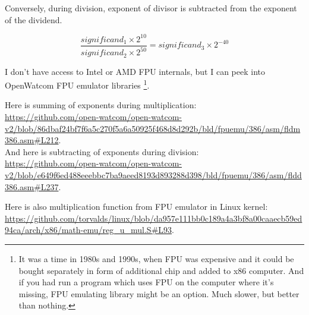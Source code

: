 Conversely, during division, exponent of divisor is subtracted from the exponent of the dividend.

\begin{equation}
\frac{significand_{1} \times 2^{10}}{significand_{2} \times 2^{50}} = significand_{3} \times 2^{-40}
\end{equation}

I don't have access to Intel or AMD FPU internals, but I can peek into OpenWatcom FPU emulator libraries
\footnote{It was a time in 1980s and 1990s, when FPU was expensive and it could be bought separately 
in form of additional chip and added to x86 computer.
And if you had run a program which uses FPU on the computer where it's missing, FPU emulating library might be an option.
Much slower, but better than nothing.}.

Here is summing of exponents during multiplication:\\
\url{https://github.com/open-watcom/open-watcom-v2/blob/86dbaf24bf7f6a5c270f5a6a50925f468d8d292b/bld/fpuemu/386/asm/fldm386.asm\#L212}.\\
And here is subtracting of exponents during division:\\
\url{https://github.com/open-watcom/open-watcom-v2/blob/e649f6ed488eeebbc7ba9aeed8193d893288d398/bld/fpuemu/386/asm/fldd386.asm\#L237}.

Here is also multiplication function from FPU emulator in Linux kernel:
\url{https://github.com/torvalds/linux/blob/da957e111bb0c189a4a3bf8a00caaecb59ed94ca/arch/x86/math-emu/reg_u_mul.S\#L93}.




\levelup{}

